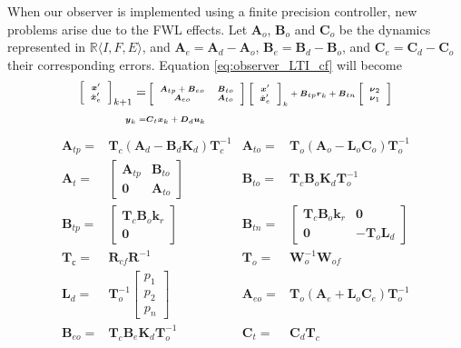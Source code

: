 \documentclass[twocolumn]{autart}    %
\newcommand{\mat}[1]{\boldsymbol{#1}}
\renewcommand{\vec}[1]{\boldsymbol{#1}}
\begin{document}
When our observer is implemented using a finite precision controller, new
problems arise due to the FWL effects.  Let $\mat{A}_o$, $\mat{B}_o$ and
$\mat{C}_o$ be the dynamics represented in $\mathbb{R} \langle I , F, E
\rangle$, and $\mat{A}_e=\mat{A}_d-\mat{A}_o$,
$\mat{B}_e=\mat{B}_d-\mat{B}_o$, and $\mat{C}_e=\mat{C}_d-\mat{C}_o$ their
corresponding errors.  Equation \eqref{eq:observer_LTI_cf} will become
%
\begin{align}
\tiny
\left [\begin{array}{c}\vec{x}'\\ \hat{\vec{x}}_e' \end{array}\right]_{k+1}
=&\tiny \left [\begin{array}{cc}\mat{A}_{tp}+\mat{B}_{eo}&\mat{B}_{to}\\ \mat{A}_{eo}&\mat{A}_{to}\end{array}\right]
\left [\begin{array}{c}\vec{x}'\\ \hat{\vec{x}}_e' \end{array}\right]_k
+\mat{B}_{tp} \vec{r}_k
+\mat{B}_{tn}\left [\begin{array}{c}\vec{\nu}_2\\ \vec{\nu}_1\end{array}\right]\nonumber\\
\tiny\vec{y}_k=&\tiny\mat{C}_{t}\vec{x}_k + \mat{D}_{d}\vec{u}_k
\label{eq:observer_LTI_FWL_cf}
\end{align}
\begin{align*}
\mat{A}_{tp}=&\mat{T}_c\left(\mat{A}_d-\mat{B}_d\mat{K}_d\right)\mat{T}_c^{-1}&
\mat{A}_{to}=&\mat{T}_o\left(\mat{A}_o-\mat{L}_o\mat{C}_o\right)\mat{T}_o^{-1}\\
\mat{A}_t=&\left [\begin{array}{cc}\mat{A}_{tp}&\mat{B}_{to}\\ \mat{0}&\mat{A}_{to}\end{array}\right]&
\mat{B}_{to}=&\mat{T}_c\mat{B}_o\mat{K}_d\mat{T}_o^{-1}\\
\mat{B}_{tp}=&\left[\begin{array}{c}\mat{T}_c\mat{B}_o\mat{k}_r\\\mat{0}\end{array}\right]&
\mat{B}_{tn}=&\left[\begin{array}{cc}\mat{T}_c\mat{B}_o\mat{k}_r&\mat{0}\\\mat{0}&-\mat{T}_o\mat{L}_d\end{array}\right]\\
\mat{T}_с=&\mat{R}_{cf}\mat{R}^{-1}&
\mat{T}_o=&\mat{W}_o^{-1}\mat{W}_{of}\\
\mat{L}_d=& \mat{T}_o^{-1}\left[ \begin{array}{c}p_1\\p_2\\p_n\end{array}\right]&
\mat{A}_{eo}=&\mat{T}_o\left(\mat{A}_e+\mat{L}_o\mat{C}_e\right)\mat{T}_o^{-1}\\
\mat{B}_{eo}=&\mat{T}_c\mat{B}_e\mat{K}_d\mat{T}_o^{-1}&
\mat{C}_t=&\mat{C}_d\mat{T}_c
\end{align*}
\end{document}
